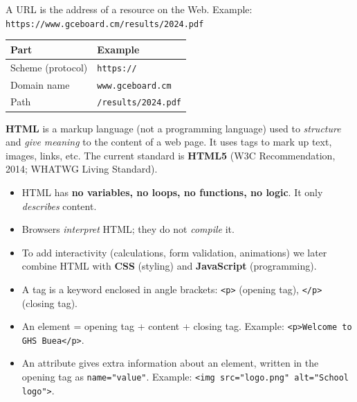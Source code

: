 \documentclass[11pt]{article}
\newcommand{\cle}[1]{{\popxbold\color{popdark}#1}}
\newcounter{popsec}
\newcounter{popsub}
\newcommand{\courssub}[1]{%
  \stepcounter{popsub}%
  \par\vspace{9pt}\noindent{\popxbold\fontsize{11.5}{13}\selectfont\color{popink}{\color{poporange}\thepopsec.\thepopsub}\hspace{6pt}#1}\par\nopagebreak\vspace{4pt}
}
\begin{document}
\begin{definition}
A \cle{URL} is the address of a resource on the Web. Example: \texttt{https://www.gceboard.cm/results/2024.pdf}
\begin{center}
\begin{tabularx}{\linewidth}{|l|X|}\hline
\textbf{Part} & \textbf{Example} \\ \hline
Scheme (protocol) & \texttt{https://} \\
Domain name & \texttt{www.gceboard.cm} \\
Path & \texttt{/results/2024.pdf} \\ \hline
\end{tabularx}
\end{center}
\end{definition}

\courssub{What is HTML?}

\begin{definition}
\textbf{HTML} is a \cle{markup language} (not a programming language) used to \emph{structure} and \emph{give meaning} to the content of a web page. It uses \cle{tags} to mark up text, images, links, etc. The current standard is \textbf{HTML5} (W3C Recommendation, 2014; WHATWG Living Standard).
\end{definition}

\begin{aretenir}
\begin{itemize}
\item HTML has \textbf{no variables, no loops, no functions, no logic}. It only \emph{describes} content.
\item Browsers \emph{interpret} HTML; they do not \emph{compile} it.
\item To add interactivity (calculations, form validation, animations) we later combine HTML with \textbf{CSS} (styling) and \textbf{JavaScript} (programming).
\end{itemize}
\end{aretenir}

\begin{definition}
\begin{itemize}
\item A \cle{tag} is a keyword enclosed in angle brackets: \texttt{<p>} (opening tag), \texttt{</p>} (closing tag).
\item An \cle{element} = opening tag + content + closing tag. Example: \texttt{<p>Welcome to GHS Buea</p>}.
\item An \cle{attribute} gives extra information about an element, written in the opening tag as \texttt{name="value"}. Example: \texttt{<img src="logo.png" alt="School logo">}.
\end{itemize}
\end{definition}
\end{document}
